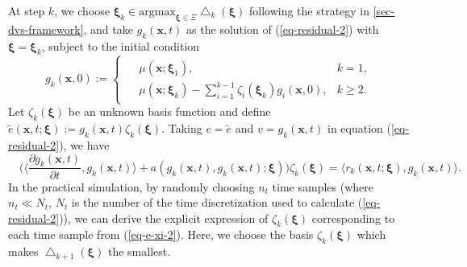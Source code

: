 \documentclass[10pt,a4paper]{article}
\numberwithin{equation}{section}
\numberwithin{lemma}{section}
\numberwithin{example}{section}
\numberwithin{definition}{section}
\numberwithin{assumption}{section}
\numberwithin{theorem}{section}
\numberwithin{proposition}{section}
\numberwithin{corollary}{section}
\numberwithin{remark}{section}
\begin{document}
At step $k$, we choose $\bm{\xi}_k\in {\text{argmax}}_{\bm{\xi}\in\Xi} \bigtriangleup_k(\bm{\xi})$ following the strategy in \cref{sec-dvs-framework}, and take $g_k(\bm{x},t)$  as the solution of (\ref{eq-residual-2}) with $\bm{\xi}=\bm{\xi}_k$, subject to the initial condition
$$
g_k(\bm{x},0):= \begin{cases}
\begin{aligned}
&\mu(\bm{x};\bm{\xi}_1), &k=1,\\
&\mu(\bm{x};\bm{\xi}_k)-\sum_{i=1}^{k-1}\zeta_i(\bm{\xi}_k)g_{i}(\bm{x},0), &k\geq 2.
\end{aligned}
\end{cases}$$ 
Let $\zeta_k(\bm{\xi})$ be an unknown basis function and define $\tilde{e}(\bm{x},t;\bm{\xi}):=g_k(\bm{x},t)\zeta_k(\bm{\xi})$. Taking $e=\tilde{e}$ and $v=g_k(\bm{x},t)$ in equation (\ref{eq-residual-2}), we have
    \begin{equation}
		\label{eq-e-xi-2}
			\quad \Big(\Big\langle \frac{\partial g_k(\bm{x},t)}{\partial t},g_k(\bm{x},t)\Big\rangle +a(g_k(\bm{x},t),g_k(\bm{x},t);\bm{\xi})\Big)\zeta_k(\bm{\xi})=\langle{r}_k(\bm{x},t;\bm{\xi}),g_k(\bm{x},t)\rangle.
	\end{equation}
In the practical simulation, by randomly choosing $n_t$ time samples (where $n_t\ll N_t$, $N_t$ is the number of the time discretization used to calculate (\ref{eq-residual-2})), we can derive the explicit expression of $\zeta_k(\bm{\xi})$ corresponding to each time sample from (\ref{eq-e-xi-2}).
Here, we choose the basis $\zeta_k(\bm{\xi})$ which makes $\bigtriangleup_{k+1}(\bm{\xi})$ the smallest. 

 




\end{document}
